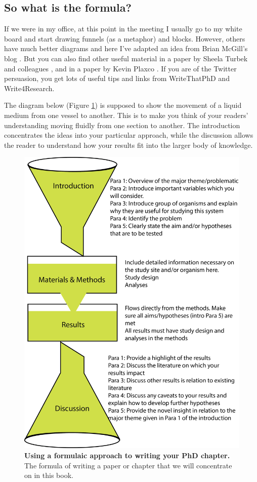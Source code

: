 \documentclass[
]{krantz}
\begin{document}
\hypertarget{so-what-is-the-formula}{%
\subsection{So what is the formula?}\label{so-what-is-the-formula}}

If we were in my office, at this point in the meeting I usually go to my white board and start drawing funnels (as a metaphor) and blocks. However, others have much better diagrams and here I've adapted an idea from Brian McGill's blog \citep{mcgill20165}. But you can also find other useful material in a paper by Sheela Turbek and colleagues \citeyearpar{turbek2016scientific}, and in a paper by Kevin Plaxco \citeyearpar{plaxco2010art}. If you are of the Twitter persuasion, you get lots of useful tips and links from WriteThatPhD and Write4Research.

The diagram below (Figure \ref{fig:formula}) is supposed to show the movement of a liquid medium from one vessel to another. This is to make you think of your readers' understanding moving fluidly from one section to another. The introduction concentrates the ideas into your particular approach, while the discussion allows the reader to understand how your results fit into the larger body of knowledge.



\begin{figure}
\includegraphics[width=0.95\linewidth]{figures/formula} \caption{\textbf{Using a formulaic approach to writing your PhD chapter.} The formula of writing a paper or chapter that we will concentrate on in this book.}\label{fig:formula}
\end{figure}
\end{document}
